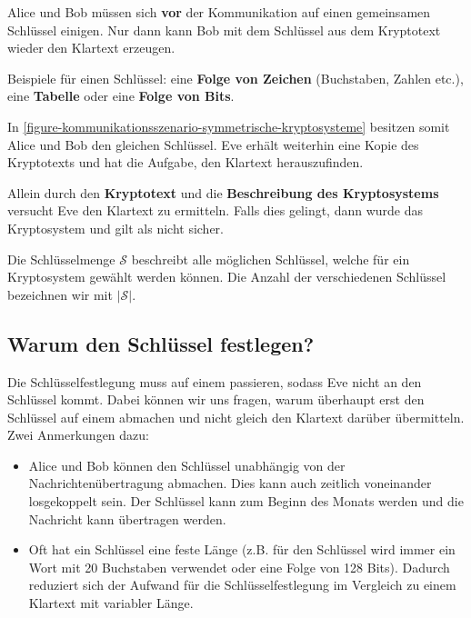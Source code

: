 Alice und Bob müssen sich \textbf{vor} der Kommunikation auf einen gemeinsamen Schlüssel einigen. Nur dann kann Bob mit dem Schlüssel aus dem Kryptotext wieder den Klartext erzeugen.

\begin{example}
Beispiele für einen Schlüssel: eine \textbf{Folge von Zeichen} (Buchstaben, Zahlen etc.), eine \textbf{Tabelle} oder eine \textbf{Folge von Bits}.
\end{example}

In \autoref{figure-kommunikationsszenario-symmetrische-kryptosysteme} besitzen somit Alice und Bob den gleichen Schlüssel. Eve erhält weiterhin eine Kopie des Kryptotexts und hat die Aufgabe, den Klartext herauszufinden.

\begin{important}
	Allein durch den \textbf{Kryptotext} und die \textbf{Beschreibung des Kryptosystems} versucht Eve den Klartext zu ermitteln. Falls dies gelingt, dann wurde das Kryptosystem  und gilt als nicht sicher.
\end{important}

\begin{definition}[Schlüsselmenge]
Die Schlüsselmenge $\mathscr{S}$ beschreibt alle möglichen Schlüssel, welche für ein Kryptosystem gewählt werden können. Die Anzahl der verschiedenen Schlüssel bezeichnen wir mit $|\mathscr{S}|$.
\end{definition}

\subsection{Warum den Schlüssel festlegen?}

Die Schlüsselfestlegung muss auf einem  passieren, sodass Eve nicht an den Schlüssel kommt. Dabei können wir uns fragen, warum überhaupt erst den Schlüssel auf einem  abmachen und nicht gleich den Klartext darüber übermitteln. Zwei Anmerkungen dazu:

\begin{itemize}
	\item Alice und Bob können den Schlüssel unabhängig von der Nachrichtenübertragung abmachen. Dies kann auch zeitlich voneinander losgekoppelt sein. Der Schlüssel kann zum Beginn des Monats werden und die Nachricht kann  übertragen werden.
	\item Oft hat ein Schlüssel eine feste Länge (z.B. für den Schlüssel wird immer ein Wort mit 20 Buchstaben verwendet oder eine Folge von 128 Bits). Dadurch reduziert sich der Aufwand für die Schlüsselfestlegung im Vergleich zu einem Klartext mit variabler Länge. 
\end{itemize}

